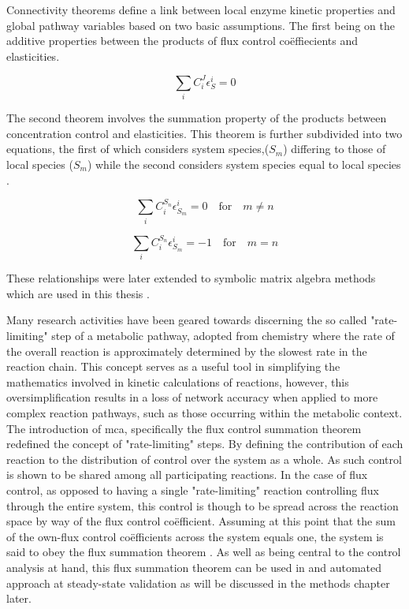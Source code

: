 Connectivity theorems define a link between local enzyme kinetic properties and global pathway variables based on two basic assumptions. The first being on the additive properties between the products of flux control co\"effiecients and elasticities.

\begin{equation}
\sum_{i}C_{i}^J\epsilon_S^i=0
\end{equation}

The second theorem involves the summation property of the products between concentration control and elasticities. This theorem is further subdivided into two equations, the first of which considers system species,($S_m$) differing to those of local species ($S_m$) while the second considers system species equal to local species \citep{Kacser1979, Westerhoff1984}.

\begin{equation}
\sum_{i}C_{i}^{S_n}\epsilon_{S_m}^i=0\quad \textrm{for}\quad m\ne n
\end{equation}

\begin{equation}
\sum_{i}C_{i}^{S_n}\epsilon_{S_m}^i=-1\quad \textrm{for}\quad m = n
\end{equation}

These relationships were later extended to symbolic matrix algebra methods which are used in this thesis \cite{Fell1992,Kacser1995,Ehlde1997,Hofmeyr2001}.

Many research activities have been geared towards discerning the so called "rate-limiting" step of a metabolic pathway, adopted from chemistry where the rate of the overall reaction is approximately determined by the slowest rate in the reaction chain. This concept serves as a useful tool in simplifying the mathematics involved in kinetic calculations of reactions, however, this oversimplification results in a loss of network accuracy when applied to more complex reaction pathways, such as those occurring within the metabolic context. The introduction of \gls{mca}, specifically the flux control summation theorem redefined the concept of "rate-limiting" steps. By defining the contribution of each reaction to the distribution of control over the system as a whole. As such control is shown to be shared among all participating reactions. In the case of flux control, as opposed to having a single "rate-limiting" reaction controlling flux through the entire system, this control is though to be spread across the reaction space by way of the flux control co\"efficient. Assuming at this point that the sum of the own-flux control co\"efficients across the system equals one, the system is said to obey the flux summation theorem \citep{Fell1992,Hofmeyr2001,Kacser1995,Ehlde1997}. As well as being central to the control analysis at hand, this flux summation theorem can be used in and automated approach at \gls{steady-state} validation as will be discussed in the methods chapter later.

